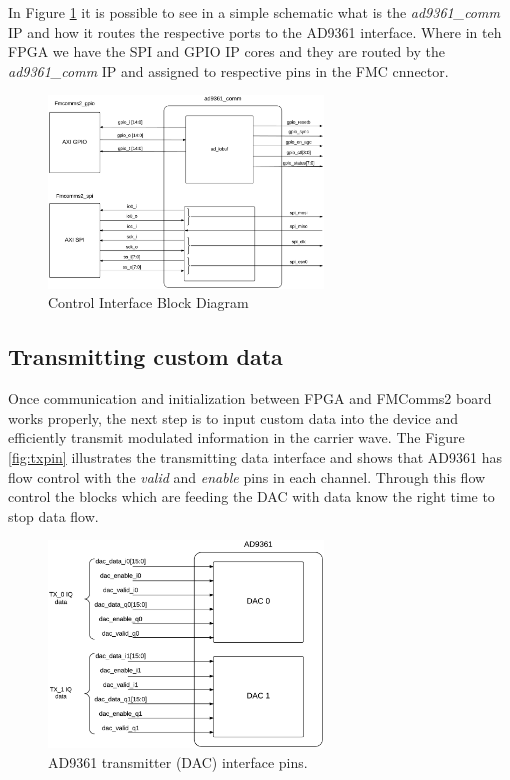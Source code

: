 In Figure \ref{fig:commif} it is possible to see in a simple schematic what is
the \emph{ad9361\_comm} IP and how it routes the respective ports to the AD9361
interface. Where in teh FPGA we have the SPI and GPIO IP cores and they are
routed by the \emph{ad9361\_comm} IP and assigned to respective pins in the FMC
cnnector.

\begin{figure}[htbp]
    \centering
    \includegraphics[width=0.65\textwidth]{./figures/comm_if}
    \caption{ Control Interface Block Diagram
    \label{fig:commif}}
\end{figure}

\subsection{Transmitting custom data}

Once communication and initialization between FPGA and FMComms2 board works
properly, the next step is to input custom data into the device and efficiently
transmit modulated information in the carrier wave. The Figure \ref{fig:txpin}
illustrates the transmitting data interface and shows that AD9361 has flow
control with the \emph{valid} and \emph{enable} pins in each channel. Through
this flow control the blocks which are feeding the DAC with data know the right
time to stop data flow.

\begin{figure}[htbp]
    \centering
    \includegraphics[width=0.65\textwidth]{./figures/ad9361tx_pins}
    \caption{ AD9361 transmitter (DAC) interface pins.
    \label{fig:txpins}}
\end{figure}

